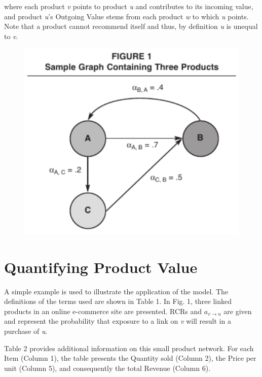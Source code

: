 where each product \textit{v} points to product \textit{u} and contributes to its incoming value, and product \textit{u}’s Outgoing Value stems from each product \textit{w} to which \textit{u} points. Note that a product cannot recommend itself and thus, by definition \textit{u} is unequal to \textit{v}.

\begin{figure}[h]
\centering
\includegraphics[]{Figures/figure_1}
\end{figure}


\section{Quantifying Product Value}

A simple example is used to illustrate the application of the model. The definitions of the terms used are shown in Table 1. In Fig. 1, three linked products in an online e-commerce site are presented. RCRs and \textit{$a_{v \rightarrow u}$} are given and represent the probability that exposure to a link on \textit{v} will result in a purchase of \textit{u}.

Table 2 provides additional information on this small product network. For each Item (Column 1), the table presents the Quantity sold (Column 2), the Price per unit (Column 5), and consequently the total Revenue (Column 6).

